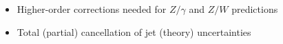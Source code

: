 \documentclass[aspectratio=169,xcolor=dvipsnames,,table,compress]{beamer}
\begin{document}
\begin{frame}
  \begin{columns}[T]
    \begin{column}{0.7\textwidth}
      \begin{itemize}
        \item Higher-order corrections needed for $Z/\gamma$ and $Z/W$ predictions 
        \item Total (partial) cancellation of jet (theory) uncertainties
      \end{itemize}
    \end{column}
    \begin{column}{0.3\textwidth}
      \vspace{-6.5mm}
    \end{column}
  \end{columns}
\end{frame}
\end{document}
